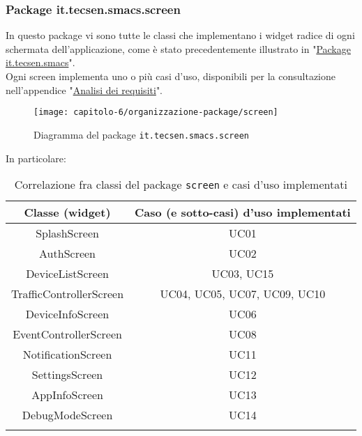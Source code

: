 \subsubsection{Package it.tecsen.smacs.screen}
\label{subsubsec:it-tecsen-smacs-screen}

In questo package vi sono tutte le classi che implementano i widget radice di ogni schermata dell'applicazione, come è stato precedentemente illustrato in "\hyperref[subsubsec:it-tecsen-smacs]{Package it.tecsen.smacs}".\\
Ogni screen implementa uno o più casi d'uso, disponibili per la consultazione nell'appendice "\hyperref[cap:analisi-dei-requisiti]{Analisi dei requisiti}".
\clearpage
\begin{figure}[!h]
  \centering 
  \texttt{[image: capitolo-6/organizzazione-package/screen]} 
  \caption{Diagramma del package \texttt{it.tecsen.smacs.screen}}
\end{figure}
In particolare:
{
\renewcommand{\arraystretch}{1.5}
\begin{longtable}{|c|c|}
    \hline
    \textbf{Classe (widget)} & \textbf{Caso (e sotto-casi) d'uso implementati} \\\hline
    \endhead
    SplashScreen & UC01\\\hline
    AuthScreen & UC02 \\\hline
    DeviceListScreen & UC03, UC15 \\\hline
    TrafficControllerScreen & UC04, UC05, UC07, UC09, UC10 \\\hline
    DeviceInfoScreen & UC06 \\\hline
    EventControllerScreen & UC08 \\\hline
    NotificationScreen & UC11 \\\hline
    SettingsScreen & UC12 \\\hline
    AppInfoScreen & UC13 \\\hline
    DebugModeScreen & UC14 \\\hline
    \caption{Correlazione fra classi del package \texttt{screen} e casi d'uso implementati}
\end{longtable}
}
